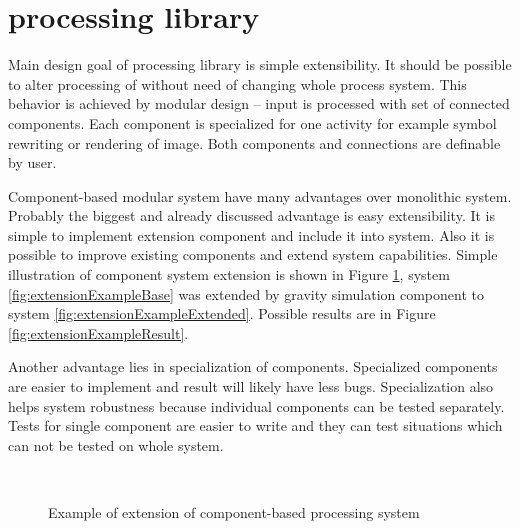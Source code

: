 
\section{\lsystem processing library}

Main design goal of \lsystem processing library is simple extensibility.
It should be possible to alter processing of \lsystem without need of changing whole process system.
This behavior is achieved by modular design -- input is processed with set of connected components.
Each component is specialized for one activity for example symbol rewriting or rendering of image.
Both components and connections are definable by user.

Component-based modular system have many advantages over monolithic system.
Probably the biggest and already discussed advantage is easy extensibility.
It is simple to implement extension component and include it into system.
Also it is possible to improve existing components and extend system capabilities.
Simple illustration of component system extension is shown in Figure \ref{fig:extensionExample}, system \ref{fig:extensionExampleBase} was extended by gravity simulation component to system \ref{fig:extensionExampleExtended}.
Possible results are in Figure \ref{fig:extensionExampleResult}.

Another advantage lies in specialization of components.
Specialized components are easier to implement and result will likely have less bugs.
Specialization also helps system robustness because individual components can be tested separately.
Tests for single component are easier to write and they can test situations which can not be tested on whole system.

\begin{figure}[h]
	\centering
	\\
	\caption{Example of extension of component-based \lsystem processing system}
	\label{fig:extensionExample}
\end{figure}

